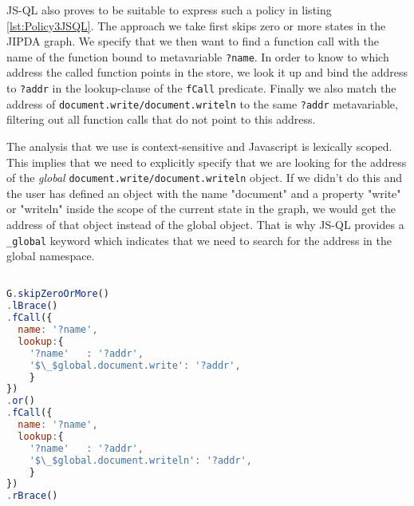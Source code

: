 JS-QL also proves to be suitable to express such a policy in listing \ref{lst:Policy3JSQL}. The approach we take first skips zero or more states in the JIPDA graph. We specify that we then want to find a function call with the name of the function bound to metavariable \texttt{?name}. In order to know to which address the called function points in the store, we look it up and bind the address to \texttt{?addr} in the lookup-clause of the \texttt{fCall} predicate. Finally we also match the address of \texttt{document.write/document.writeln} to the same \texttt{?addr} metavariable, filtering out all function calls that do not point to this address.

The analysis that we use is context-sensitive and Javascript is lexically scoped. This implies that we need to explicitly specify that we are looking for the address of the \textit{global} \texttt{document.write/document.writeln} object. If we didn't do this and the user has defined an object with the name "document" and a property "write" or "writeln" inside the scope of the current state in the graph, we would get the address of that object instead of the global object. That is why JS-QL provides a \texttt{\_global} keyword which indicates that we need to search for the address in the global namespace. 

\begin{lstlisting}[label={lst:Policy3JSQL},language=JavaScript,caption=Policy 3 in JS-QL,mathescape=true]  % float=t?

G.skipZeroOrMore()
.lBrace()
.fCall({
  name: '?name',
  lookup:{
    '?name'   : '?addr',
    '$\_$global.document.write': '?addr',
    }
})
.or()
.fCall({
  name: '?name',
  lookup:{
    '?name'   : '?addr',
    '$\_$global.document.writeln': '?addr',
    }
})
.rBrace()
\end{lstlisting}


